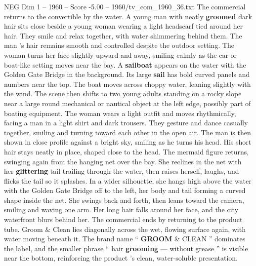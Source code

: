 \begin{textsample}{NEG Dim 1 – 1960 – Score -5.00 – 1960/tv\_com\_1960\_36.txt}
The commercial returns to the convertible by the water.
A young man with neatly \textbf{groomed} dark hair sits close beside a young woman wearing a light headscarf tied around her hair.
They smile and relax together, with water shimmering behind them.
The man ’s hair remains smooth and controlled despite the outdoor setting.
The woman turns her face slightly upward and away, smiling calmly as the car or boat-like setting moves near the bay.
A \textbf{sailboat} appears on the water with the Golden Gate Bridge in the background.
Its large \textbf{sail} has bold curved panels and numbers near the top.
The boat moves across choppy water, leaning slightly with the wind.
The scene then shifts to two young adults standing on a rocky slope near a large round mechanical or nautical object at the left edge, possibly part of boating equipment.
The woman wears a light outfit and moves rhythmically, facing a man in a light shirt and dark trousers.
They gesture and dance casually together, smiling and turning toward each other in the open air.
The man is then shown in close profile against a bright sky, smiling as he turns his head.
His short hair stays neatly in place, shaped close to the head.
The mermaid figure returns, swinging again from the hanging net over the bay.
She reclines in the net with her \textbf{glittering} tail trailing through the water, then raises herself, laughs, and flicks the tail so it splashes.
In a wider silhouette, she hangs high above the water with the Golden Gate Bridge off to the left, her body and tail forming a curved shape inside the net.
She swings back and forth, then leans toward the camera, smiling and waving one arm.
Her long hair falls around her face, and the city waterfront blurs behind her.
The commercial ends by returning to the product tube.
Groom \& Clean lies diagonally across the wet, flowing surface again, with water moving beneath it.
The brand name “ \textbf{GROOM} \& CLEAN ” dominates the label, and the smaller phrase “ hair \textbf{grooming} — without grease ” is visible near the bottom, reinforcing the product ’s clean, water-soluble presentation.

\end{textsample}
